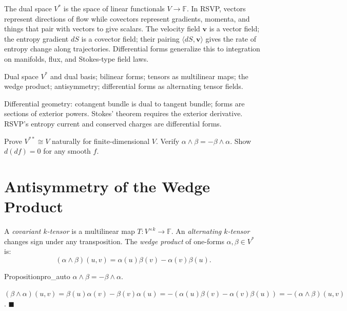 \documentclass[12pt, twoside, openright, a4paper]{book}
\renewenvironment{proof}{%
  \par\medskip\noindent{\color{RSVPgreen}\bfseries\sffamily Proof.}\enspace\ignorespaces
}{\hfill{\color{RSVPgreen}$\blacksquare$}\par\medskip}
\newcommand{\F}{\mathbb{F}}
\begin{document}
\begin{motivation}
The dual space $V^*$ is the space of linear functionals $V \to \F$.
In RSVP, vectors represent directions of flow while covectors represent gradients, momenta, and things that pair with vectors to give scalars.
The velocity field $\mathbf{v}$ is a vector field; the entropy gradient $dS$ is a covector field; their pairing $\langle dS, \mathbf{v}\rangle$ gives the rate of entropy change along trajectories.
Differential forms generalize this to integration on manifolds, flux, and Stokes-type field laws.
\end{motivation}

\begin{structures}
Dual space $V^*$ and dual basis; bilinear forms; tensors as multilinear maps; the wedge product; antisymmetry; differential forms as alternating tensor fields.
\end{structures}

\begin{dependencies}
Differential geometry: cotangent bundle is dual to tangent bundle; forms are sections of exterior powers.
Stokes' theorem requires the exterior derivative.
RSVP's entropy current and conserved charges are differential forms.
\end{dependencies}

\begin{exercises_box}
Prove $V^{**} \cong V$ naturally for finite-dimensional $V$.
Verify $\alpha \wedge \beta = -\beta \wedge \alpha$.
Show $d(df) = 0$ for any smooth $f$.
\end{exercises_box}

\section{Antisymmetry of the Wedge Product}

A \emph{covariant $k$-tensor} is a multilinear map $T: V^{\times k} \to \F$.
An \emph{alternating $k$-tensor} changes sign under any transposition.
The \emph{wedge product} of one-forms $\alpha,\beta \in V^*$ is:
\[(\alpha \wedge \beta)(u,v) = \alpha(u)\beta(v) - \alpha(v)\beta(u).\]

\begin{proposition}{Proposition}{pro_auto}
$\alpha \wedge \beta = -\beta \wedge \alpha$.
\end{proposition}
\begin{proof}
$(\beta \wedge \alpha)(u,v) = \beta(u)\alpha(v) - \beta(v)\alpha(u) = -(\alpha(u)\beta(v) - \alpha(v)\beta(u)) = -(\alpha\wedge\beta)(u,v)$.
\end{proof}
\end{document}
